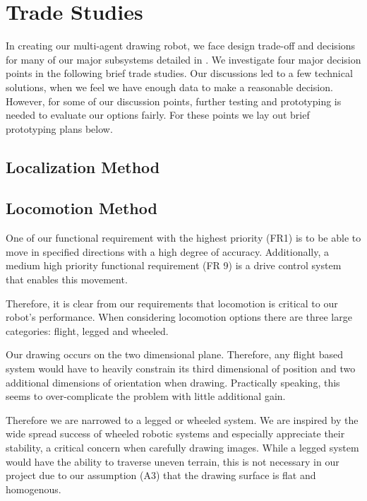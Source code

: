 
\section{Trade Studies}
\label{sec:trade_studies}

In creating our multi-agent drawing robot, we face design trade-off and decisions for many of our major subsystems detailed in . We investigate four major decision points in the following brief trade studies. Our discussions led to a few technical solutions, when we feel we have enough data to make a reasonable decision. However, for some of our discussion points, further testing and prototyping is needed to evaluate our options fairly. For these points we lay out brief prototyping plans below. 

\subsection{Localization Method}

\subsection{Locomotion Method}
One of our functional requirement with the highest priority (FR1) is to be able to move in specified directions with a high degree of accuracy.  Additionally, a medium high priority functional requirement (FR 9) is a drive control system that enables this movement. 

Therefore, it is clear from our requirements that locomotion is critical to our robot's performance. When considering locomotion options there are three large categories: flight, legged and wheeled. 

Our drawing occurs on the two dimensional plane. Therefore, any flight based system would have to heavily constrain its third dimensional of position and two additional dimensions of orientation when drawing. Practically speaking, this seems to over-complicate the problem with little additional gain. 

Therefore we are narrowed to a legged or wheeled system.  We are inspired by the wide spread success of wheeled robotic systems and especially appreciate their stability, a critical concern when carefully drawing images. While a legged system would have the ability to traverse uneven terrain, this is not necessary in our project due to our assumption (A3) that the drawing surface is flat and homogenous. 

